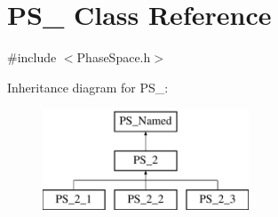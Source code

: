 \hypertarget{classPS__2}{}\section{P\+S\+\_ Class Reference}
\label{classPS__2}


{\ttfamily \#include $<$Phase\+Space.\+h$>$}

Inheritance diagram for P\+S\+\_\+:\begin{figure}[H]
\begin{center}
\leavevmode
\includegraphics[height=3.000000cm]{classPS__2}
\end{center}
\end{figure}
